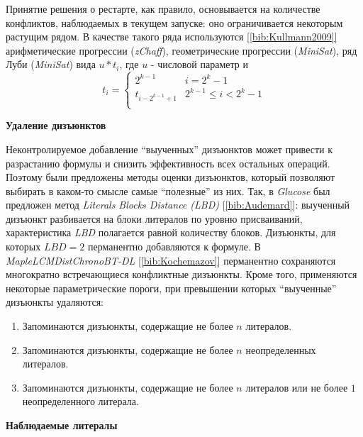 Принятие решения о рестарте, как правило, основывается на количестве конфликтов, наблюдаемых в текущем запуске: 
оно ограничивается некоторым растущим рядом. В качестве такого ряда используются [\ref{bib:Kullmann2009}] арифметические прогрессии (\textit{zChaff}), геометрические прогрессии (\textit{MiniSat}), ряд Луби (\textit{MiniSat}) вида $u * t_i$, где $u$ - числовой параметр и 
\begin{equation*}
t_i = 
\begin{cases}
2^{k-1} & i = 2^k - 1 \\
t_{i - 2^{k-1} + 1} & 2^{k-1} \leq i < 2^k - 1 \\
\end{cases}
\end{equation*}

\textbf{Удаление дизъюнктов}

Неконтролируемое добавление \enquote{выученных} дизъюнктов может привести к разрастанию формулы и снизить эффективность всех остальных операций. Поэтому были предложены методы оценки дизъюнктов, который позволяют выбирать в каком-то смысле самые \enquote{полезные} из них. 
Так, в \textit{Glucose} был предложен метод \textit{Literals Blocks Distance (LBD)} [\ref{bib:Audemard}]: 
выученный дизъюнкт разбивается на блоки литералов по уровню присваиваний, 
характеристика \textit{LBD} полагается равной количеству блоков. Дизъюнкты, для которых $LBD=2$ перманентно добавляются к формуле. 
В \textit{MapleLCMDistChronoBT-DL} [\ref{bib:Kochemazov}] перманентно сохраняются многократно встречающиеся конфликтные дизъюнкты.  
Кроме того, применяются некоторые параметрические пороги, при превышении которых \enquote{выученные} дизъюнкты удаляются:

\begin{enumerate}[leftmargin=1cm,topsep=0pt,itemsep=-1ex,partopsep=1ex,parsep=1ex,label=\arabic{*}.]

\item Запоминаются дизъюнкты, содержащие не более $n$ литералов.

\item Запоминаются дизъюнкты, содержащие не более $n$ неопределенных литералов.

\item Запоминаются дизъюнкты, содержащие не более $n$ литералов или не более $1$ неопределенного литерала.

\end{enumerate}

\textbf{Наблюдаемые литералы}

